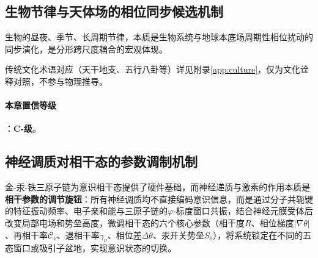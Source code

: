 \documentclass[12pt,a4paper,twocolumn]{article}
\renewcommand{\phi}{\varphi}
\begin{document}
\subsection{生物节律与天体场的相位同步候选机制}
生物的昼夜、季节、长周期节律，本质是生物系统与地球本底场周期性相位扰动的同步演化，是分形跨尺度耦合的宏观体现。

传统文化术语对应（天干地支、五行八卦等）详见附录\ref{app:culture}，仅为文化诠释对照，不参与物理推导。

\paragraph{本章置信等级}：\textbf{C-级}。


\subsection{神经调质对相干态的参数调制机制}
\label{subsec:neuromodulator}
金-汞-铁三原子链为意识相干态提供了硬件基础，而神经递质与激素的作用本质是\textbf{相干参数的调节旋钮}：所有神经调质均不直接编码意识信息，而是通过分子共轭键的特征振动频率、电子亲和能与三原子链的$\phi$-标度窗口共振，结合神经元膜受体后改变局部电场和势垒高度，微调相干态的六个核心参数（相干度$R$、相位梯度$|\nabla\theta|$、再相干率$\mathcal{C}_\nu$、退相干率$\gamma_\nu$、相位差$\Delta\theta$、汞开关势垒$S_0$），将系统锁定在不同的五态窗口或吸引子盆地，实现意识状态的切换。
\end{document}
